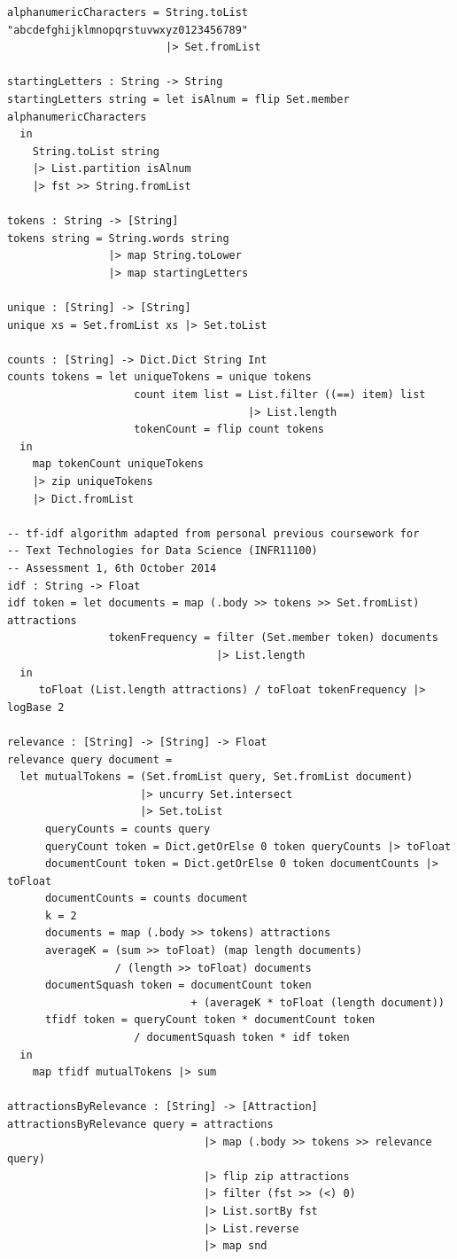 \documentclass[12pt]{article}
\begin{document}
\begin{appendices}
\begin{verbatim}
alphanumericCharacters = String.toList "abcdefghijklmnopqrstuvwxyz0123456789"
                         |> Set.fromList 
  
startingLetters : String -> String
startingLetters string = let isAlnum = flip Set.member alphanumericCharacters
  in
    String.toList string  
    |> List.partition isAlnum
    |> fst >> String.fromList
  
tokens : String -> [String]
tokens string = String.words string 
                |> map String.toLower 
                |> map startingLetters

unique : [String] -> [String]
unique xs = Set.fromList xs |> Set.toList 

counts : [String] -> Dict.Dict String Int
counts tokens = let uniqueTokens = unique tokens
                    count item list = List.filter ((==) item) list 
                                      |> List.length
                    tokenCount = flip count tokens
  in
    map tokenCount uniqueTokens 
    |> zip uniqueTokens 
    |> Dict.fromList

-- tf-idf algorithm adapted from personal previous coursework for
-- Text Technologies for Data Science (INFR11100)
-- Assessment 1, 6th October 2014
idf : String -> Float
idf token = let documents = map (.body >> tokens >> Set.fromList) attractions
                tokenFrequency = filter (Set.member token) documents 
                                 |> List.length
  in 
     toFloat (List.length attractions) / toFloat tokenFrequency |> logBase 2
    
relevance : [String] -> [String] -> Float
relevance query document = 
  let mutualTokens = (Set.fromList query, Set.fromList document) 
                     |> uncurry Set.intersect 
                     |> Set.toList
      queryCounts = counts query
      queryCount token = Dict.getOrElse 0 token queryCounts |> toFloat
      documentCount token = Dict.getOrElse 0 token documentCounts |> toFloat
      documentCounts = counts document
      k = 2
      documents = map (.body >> tokens) attractions
      averageK = (sum >> toFloat) (map length documents) 
                 / (length >> toFloat) documents
      documentSquash token = documentCount token 
                             + (averageK * toFloat (length document))
      tfidf token = queryCount token * documentCount token 
                    / documentSquash token * idf token
  in
    map tfidf mutualTokens |> sum
    
attractionsByRelevance : [String] -> [Attraction]
attractionsByRelevance query = attractions
                               |> map (.body >> tokens >> relevance query)
                               |> flip zip attractions
                               |> filter (fst >> (<) 0)
                               |> List.sortBy fst
                               |> List.reverse 
                               |> map snd
\end{verbatim}

\end{appendices}

\end{document}
